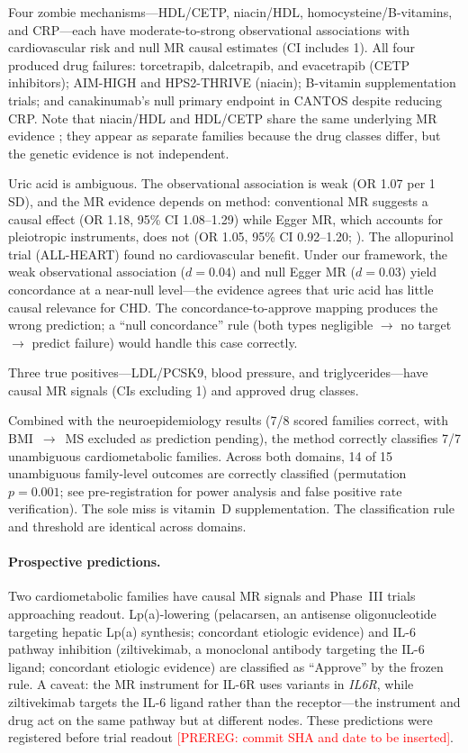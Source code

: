 \documentclass[11pt]{article}
\begin{document}
Four zombie mechanisms---HDL/CETP, niacin/HDL, homocysteine/B-vitamins, and CRP---each have moderate-to-strong observational associations with cardiovascular risk and null MR causal estimates (CI includes 1). All four produced drug failures: torcetrapib, dalcetrapib, and evacetrapib (CETP inhibitors); AIM-HIGH and HPS2-THRIVE (niacin); B-vitamin supplementation trials; and canakinumab's null primary endpoint in CANTOS despite reducing CRP. Note that niacin/HDL and HDL/CETP share the same underlying MR evidence \citep{voight2012}; they appear as separate families because the drug classes differ, but the genetic evidence is not independent.

Uric acid is ambiguous. The observational association is weak (OR 1.07 per 1 SD), and the MR evidence depends on method: conventional MR suggests a causal effect (OR 1.18, 95\% CI 1.08--1.29) while Egger MR, which accounts for pleiotropic instruments, does not (OR 1.05, 95\% CI 0.92--1.20; \citealp{white2016}). The allopurinol trial (ALL-HEART) found no cardiovascular benefit. Under our framework, the weak observational association ($d = 0.04$) and null Egger MR ($d = 0.03$) yield concordance at a near-null level---the evidence agrees that uric acid has little causal relevance for CHD. The concordance-to-approve mapping produces the wrong prediction; a ``null concordance'' rule (both types negligible $\to$ no target $\to$ predict failure) would handle this case correctly.

Three true positives---LDL/PCSK9, blood pressure, and triglycerides---have causal MR signals (CIs excluding 1) and approved drug classes.

Combined with the neuroepidemiology results (7/8 scored families correct, with BMI~$\to$~MS excluded as prediction pending), the method correctly classifies 7/7 unambiguous cardiometabolic families. Across both domains, 14 of 15 unambiguous family-level outcomes are correctly classified (permutation $p = 0.001$; see pre-registration for power analysis and false positive rate verification). The sole miss is vitamin~D supplementation. The classification rule and threshold are identical across domains.

\paragraph{Prospective predictions.}
Two cardiometabolic families have causal MR signals and Phase~III trials approaching readout. Lp(a)-lowering (pelacarsen, an antisense oligonucleotide targeting hepatic Lp(a) synthesis; concordant etiologic evidence) and IL-6 pathway inhibition (ziltivekimab, a monoclonal antibody targeting the IL-6 ligand; concordant etiologic evidence) are classified as ``Approve'' by the frozen rule. A caveat: the MR instrument for IL-6R uses variants in \emph{IL6R}, while ziltivekimab targets the IL-6 ligand rather than the receptor---the instrument and drug act on the same pathway but at different nodes. These predictions were registered before trial readout \textcolor{red}{[PREREG: commit SHA and date to be inserted]}.
\end{document}
